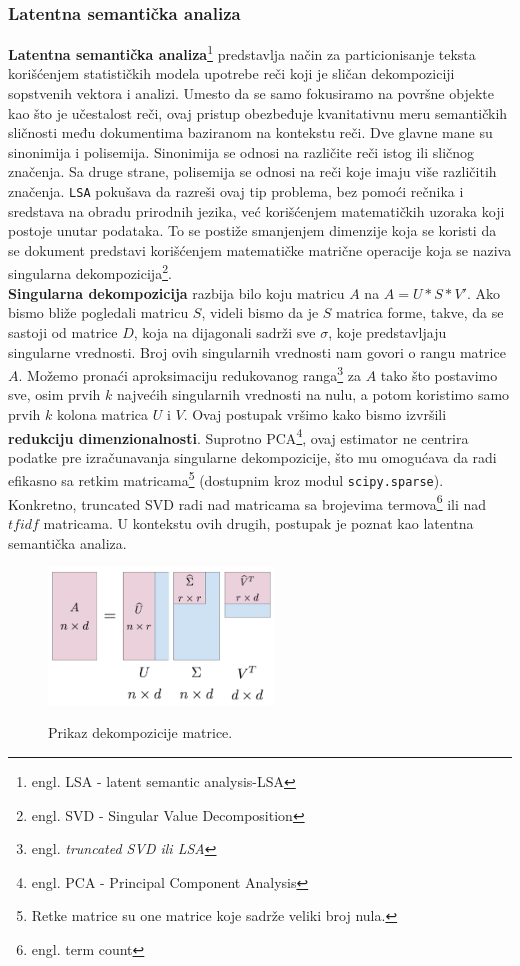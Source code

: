 \documentclass[a4paper]{article}
\begin{document}
\subsubsection{Latentna semantička analiza}
\textbf{Latentna semantička analiza}\footnote{engl. LSA - latent semantic analysis-LSA} predstavlja način za particionisanje teksta korišćenjem statističkih modela upotrebe reči koji je sličan dekompoziciji sopstvenih vektora i analizi. Umesto da se samo fokusiramo na površne objekte kao što je učestalost reči, ovaj pristup obezbeđuje kvanitativnu meru semantičkih sličnosti među dokumentima baziranom na kontekstu reči. Dve glavne mane su sinonimija i polisemija. Sinonimija se odnosi na različite reči istog ili sličnog značenja. Sa druge strane, polisemija se odnosi na reči koje imaju više različitih značenja. \texttt{LSA} pokušava da razreši ovaj tip problema, bez pomoći rečnika i sredstava na obradu prirodnih jezika, već korišćenjem matematičkih uzoraka koji postoje unutar podataka. To se postiže smanjenjem dimenzije koja se koristi da se dokument predstavi korišćenjem matematičke matrične operacije koja se naziva singularna dekompozicija\footnote{engl. SVD - Singular Value Decomposition}.\\

\textbf{Singularna dekompozicija} razbija bilo koju matricu $A$ na $A=U*S*V'$. Ako bismo bliže pogledali matricu $S$, videli bismo da je $S$ matrica forme, takve, da se sastoji od matrice $D$, koja na dijagonali sadrži sve $\sigma$, koje predstavljaju singularne vrednosti. Broj ovih singularnih vrednosti nam govori o rangu matrice $A$. Možemo pronaći aproksimaciju redukovanog ranga\footnote{engl. \em{truncated SVD} ili \em{LSA}} za $A$ tako što postavimo sve, osim prvih $k$ najvećih singularnih vrednosti na nulu, a potom koristimo samo prvih $k$ kolona matrica $U$ i $V$. Ovaj postupak vršimo kako bismo izvršili \textbf{redukciju dimenzionalnosti}. Suprotno PCA\footnote{engl. PCA - Principal Component Analysis}, ovaj estimator ne centrira podatke pre izračunavanja singularne dekompozicije, što mu omogućava da radi efikasno sa retkim matricama\footnote{Retke matrice su one matrice koje sadrže veliki broj nula.} (dostupnim kroz modul \texttt{scipy.sparse}). Konkretno, truncated SVD radi nad matricama sa brojevima termova\footnote{engl. term count} ili nad $tfidf$ matricama. U kontekstu ovih drugih, postupak je poznat kao latentna semantička analiza.\\

\begin{figure}[t]
\includegraphics[width=6cm]{Pictures/svd-matrices.png}
\centering
\label{fig:pr1}
\caption{Prikaz dekompozicije matrice.}
\end{figure}
\end{document}
